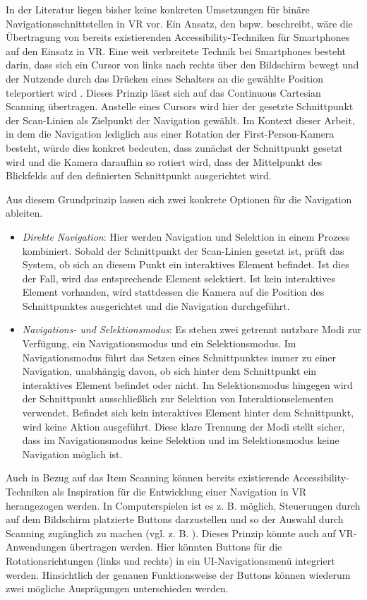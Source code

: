 In der Literatur liegen bisher keine konkreten Umsetzungen für binäre Navigationsschnittstellen in VR vor. Ein Ansatz, den bspw. \citet{wentzel_bring-your-own_2023} beschreibt, wäre die Übertragung von bereits existierenden Accessibility-Techniken für Smartphones auf den Einsatz in VR. Eine weit verbreitete Technik bei Smartphones besteht darin, dass sich ein Cursor von links nach rechts über den Bildschirm bewegt und der Nutzende durch das Drücken eines Schalters an die gewählte Position teleportiert wird \citep{wentzel_bring-your-own_2023}. Dieses Prinzip lässt sich auf das Continuous Cartesian Scanning übertragen. Anstelle eines Cursors wird hier der gesetzte Schnittpunkt der Scan-Linien als Zielpunkt der Navigation gewählt. Im Kontext dieser Arbeit, in dem die Navigation lediglich aus einer Rotation der First-Person-Kamera besteht, würde dies konkret bedeuten, dass zunächst der Schnittpunkt gesetzt wird und die Kamera daraufhin so rotiert wird, dass der Mittelpunkt des Blickfelds auf den definierten Schnittpunkt ausgerichtet wird. 

Aus diesem Grundprinzip lassen sich zwei konkrete Optionen für die Navigation ableiten.

\begin{itemize}
    \item \textit{Direkte Navigation}: Hier werden Navigation und Selektion in einem Prozess kombiniert. Sobald der Schnittpunkt der Scan-Linien gesetzt ist, prüft das System, ob sich an diesem Punkt ein interaktives Element befindet. Ist dies der Fall, wird das entsprechende Element selektiert. Ist kein interaktives Element vorhanden, wird stattdessen die Kamera auf die Position des Schnittpunktes ausgerichtet und die Navigation durchgeführt.
    \item \textit{Navigations- und Selektionsmodus}: Es stehen zwei getrennt nutzbare Modi zur Verfügung, ein Navigationsmodus und ein Selektionsmodus. Im Navigationsmodus führt das Setzen eines Schnittpunktes immer zu einer Navigation, unabhängig davon, ob sich hinter dem Schnittpunkt ein interaktives Element befindet oder nicht. Im Selektionsmodus hingegen wird der Schnittpunkt ausschließlich zur Selektion von Interaktionselementen verwendet. Befindet sich kein interaktives Element hinter dem Schnittpunkt, wird keine Aktion ausgeführt. Diese klare Trennung der Modi stellt sicher, dass im Navigationsmodus keine Selektion und im Selektionsmodus keine Navigation möglich ist.
\end{itemize}

Auch in Bezug auf das Item Scanning können bereits existierende Accessibility-Techniken als Inspiration für die Entwicklung einer Navigation in VR herangezogen werden. In Computerspielen ist es z. B. möglich, Steuerungen durch auf dem Bildschirm platzierte Buttons darzustellen und so der Auswahl durch Scanning zugänglich zu machen (vgl. z. B. \citep{10.1145/2159365.2159386, trewin_exploring_2009}).  
Dieses Prinzip könnte auch auf VR-Anwendungen übertragen werden. Hier könnten Buttons für die Rotationsrichtungen (links und rechts) in ein UI-Navigationsmenü integriert werden.  Hinsichtlich der genauen Funktionsweise der Buttons können wiederum zwei mögliche Ausprägungen unterschieden werden. 

